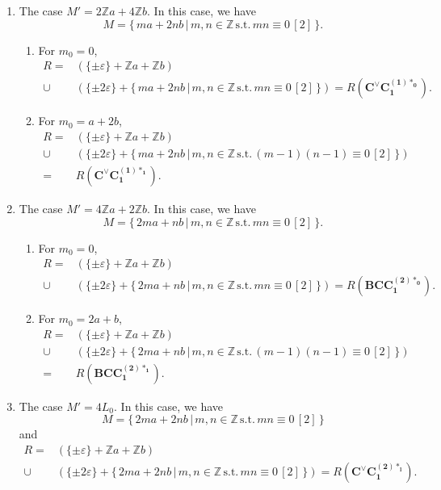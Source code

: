 \documentclass[11pt]{amsart}
\newcommand{\Z}{\mathbb{Z}}
\newcommand{\vep}{\varepsilon}
\begin{document}
\begin{enumerate}
\item The case $M'=2\Z a+4\Z b$. In this case, we have
\[ M=\{\, ma+2nb\, \vert\, m,n \in \Z \, \text{s.t.}\, mn\equiv 0\, [2]\, \}. \]
\begin{enumerate}
\item[(I)] For $m_0=0$, 
\begin{align*}
R=
&(\{ \pm\vep \}+\Z a+\Z b) \\
\cup 
&(\{ \pm 2\vep \}+\{\, ma+2nb\, \vert\, m,n \in \Z\, \text{s.t.}\, mn \equiv 0\, [2]\, \})
= R(\mathbf{C^\vee C_1^{(1)\ast_0}}).
\end{align*}
\item[(II)] For $m_0=a+2b$, 
\begin{align*}
R=
&(\{ \pm\vep \}+\Z a+\Z b) \\
\cup 
&(\{ \pm 2\vep \}+\{\, ma+2nb\, \vert\, m,n \in \Z\, \text{s.t.}\, (m-1)(n-1) \equiv 0\, [2]\, \}) \\
= 
&R(\mathbf{C^\vee C_1^{(1)\ast_1}}).
\end{align*}
\end{enumerate}
\item The case $M'=4\Z a+2\Z b$. In this case, we have
\[ M=\{\, 2ma+nb\, \vert\, m,n \in \Z \, \text{s.t.}\, mn\equiv 0\, [2]\, \}. \]
\begin{enumerate}
\item[(I)] For $m_0=0$, 
\begin{align*}
R=
&(\{ \pm\vep \}+\Z a+\Z b) \\
\cup 
&(\{ \pm 2\vep \}+\{\, 2ma+nb\, \vert\, m,n \in \Z\, \text{s.t.}\, mn \equiv 0\, [2]\, \})
= R(\mathbf{BCC_1^{(2)\ast_0}}).
\end{align*}
\item[(II)] For $m_0=2a+b$, 
\begin{align*}
R=
&(\{ \pm\vep \}+\Z a+\Z b) \\
\cup 
&(\{ \pm 2\vep \}+\{\, 2ma+nb\, \vert\, m,n \in \Z\, \text{s.t.}\, (m-1)(n-1) \equiv 0\, [2]\, \}) \\
= 
&R(\mathbf{BCC_1^{(2)\ast_1}}).
\end{align*}
\end{enumerate}
\item The case $M'=4L_0$. In this case, we have
\[ M=\{\, 2ma+2nb\, \vert\, m,n \in \Z \, \text{s.t.}\, mn\equiv 0\, [2]\, \} \]
and  
\begin{align*}
R=
&(\{ \pm\vep \}+\Z a+\Z b) \\
\cup 
&(\{ \pm 2\vep \}+\{\, 2ma+2nb\, \vert\, m,n \in \Z\, \text{s.t.}\, mn \equiv 0\, [2]\, \})
= R(\mathbf{C^\vee C_1^{(2)\ast_l}}).
\end{align*}
\end{enumerate}
\end{document}
